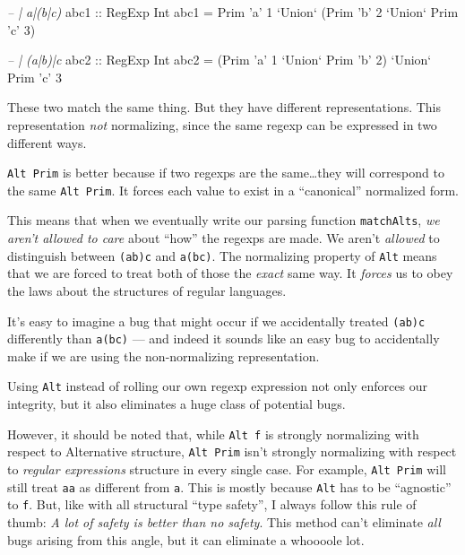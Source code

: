 \documentclass[]{article}
\newenvironment{Shaded}{}{}
\newcommand{\CharTok}[1]{\textcolor[rgb]{0.25,0.44,0.63}{#1}}
\newcommand{\CommentTok}[1]{\textcolor[rgb]{0.38,0.63,0.69}{\textit{#1}}}
\newcommand{\DataTypeTok}[1]{\textcolor[rgb]{0.56,0.13,0.00}{#1}}
\newcommand{\DecValTok}[1]{\textcolor[rgb]{0.25,0.63,0.44}{#1}}
\newcommand{\FunctionTok}[1]{\textcolor[rgb]{0.02,0.16,0.49}{#1}}
\newcommand{\NormalTok}[1]{#1}
\newcommand{\OtherTok}[1]{\textcolor[rgb]{0.00,0.44,0.13}{#1}}
\begin{document}
\begin{Shaded}
\begin{Highlighting}[]
\CommentTok{-- | a|(b|c)}
\OtherTok{abc1 ::} \DataTypeTok{RegExp} \DataTypeTok{Int}
\NormalTok{abc1 }\FunctionTok{=} \DataTypeTok{Prim} \CharTok{'a'} \DecValTok{1} \OtherTok{`Union`}\NormalTok{ (}\DataTypeTok{Prim} \CharTok{'b'} \DecValTok{2} \OtherTok{`Union`} \DataTypeTok{Prim} \CharTok{'c'} \DecValTok{3}\NormalTok{)}

\CommentTok{-- | (a|b)|c}
\OtherTok{abc2 ::} \DataTypeTok{RegExp} \DataTypeTok{Int}
\NormalTok{abc2 }\FunctionTok{=}\NormalTok{ (}\DataTypeTok{Prim} \CharTok{'a'} \DecValTok{1} \OtherTok{`Union`} \DataTypeTok{Prim} \CharTok{'b'} \DecValTok{2}\NormalTok{) }\OtherTok{`Union`} \DataTypeTok{Prim} \CharTok{'c'} \DecValTok{3}
\end{Highlighting}
\end{Shaded}

These two match the same thing. But they have different representations. This
representation \emph{not} normalizing, since the same regexp can be expressed in
two different ways.

\texttt{Alt\ Prim} is better because if two regexps are the same\ldots{}they
will correspond to the same \texttt{Alt\ Prim}. It forces each value to exist in
a ``canonical'' normalized form.

This means that when we eventually write our parsing function
\texttt{matchAlts}, \emph{we aren't allowed to care} about ``how'' the regexps
are made. We aren't \emph{allowed} to distinguish between
\texttt{(a\textbar{}b)\textbar{}c} and \texttt{a\textbar{}(b\textbar{}c)}. The
normalizing property of \texttt{Alt} means that we are forced to treat both of
those the \emph{exact} same way. It \emph{forces} us to obey the laws about the
structures of regular languages.

It's easy to imagine a bug that might occur if we accidentally treated
\texttt{(a\textbar{}b)\textbar{}c} differently than
\texttt{a\textbar{}(b\textbar{}c)} --- and indeed it sounds like an easy bug to
accidentally make if we are using the non-normalizing representation.

Using \texttt{Alt} instead of rolling our own regexp expression not only
enforces our integrity, but it also eliminates a huge class of potential bugs.

However, it should be noted that, while \texttt{Alt\ f} is strongly normalizing
with respect to Alternative structure, \texttt{Alt\ Prim} isn't strongly
normalizing with respect to \emph{regular expressions} structure in every single
case. For example, \texttt{Alt\ Prim} will still treat \texttt{a\textbar{}a} as
different from \texttt{a}. This is mostly because \texttt{Alt} has to be
``agnostic'' to \texttt{f}. But, like with all structural ``type safety'', I
always follow this rule of thumb: \emph{A lot of safety is better than no
safety}. This method can't eliminate \emph{all} bugs arising from this angle,
but it can eliminate a whoooole lot.
\end{document}
